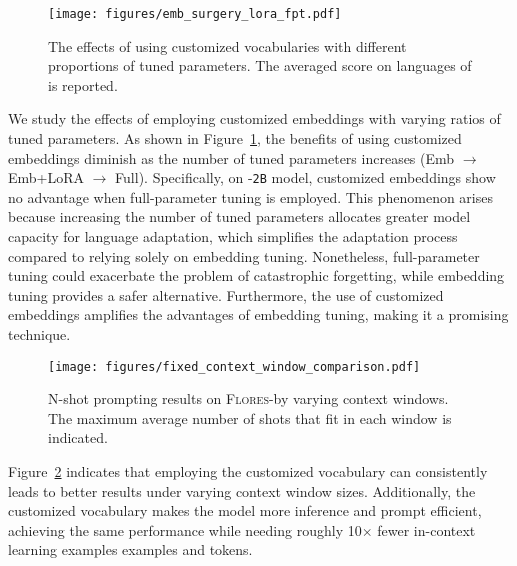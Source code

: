 \begin{figure}[t]
    \setlength{\abovecaptionskip}{-0.0001cm}
    \setlength{\belowcaptionskip}{-0.25cm}
    \centering
    \texttt{[image: figures/emb\_surgery\_lora\_fpt.pdf]}
    \vspace{-8mm}
    \caption{The effects of using customized vocabularies with different proportions of tuned parameters. The averaged score on \sea languages of \flores is reported.}
    \vspace{-6mm}
    \label{fig:emb_surgery_lora_fpt}
\end{figure}
We study the effects of employing customized embeddings with varying ratios of tuned parameters. As shown in Figure~\ref{fig:emb_surgery_lora_fpt}, the benefits of using customized embeddings diminish as the number of tuned parameters increases (Emb $\rightarrow$ Emb+LoRA $\rightarrow$ Full). Specifically, on \gemmatwo-\texttt{2B} model, customized embeddings show no advantage when full-parameter tuning is employed. This phenomenon arises because increasing the number of tuned parameters allocates greater model capacity for language adaptation, which simplifies the adaptation process compared to relying solely on embedding tuning. Nonetheless, full-parameter tuning could exacerbate the problem of catastrophic forgetting, while embedding tuning provides a safer alternative. Furthermore, the use of customized embeddings amplifies the advantages of embedding tuning, making it a promising technique.

\begin{figure}[t]
    \setlength{\abovecaptionskip}{-0.0001cm}
    \setlength{\belowcaptionskip}{-0.35cm}
    \centering
    \texttt{[image: figures/fixed\_context\_window\_comparison.pdf]}
    \vspace{-5mm}
    \caption{N-shot prompting results on \textsc{Flores}-\sea by varying context windows. The maximum average number of shots that fit in each window is indicated.}
    \vspace{-4mm}
    \label{fig:fixed_context_window_comparison}
\end{figure}
Figure~\ref{fig:fixed_context_window_comparison} indicates that employing the customized vocabulary can consistently leads to better results under varying context window sizes. Additionally, the customized vocabulary makes the model more inference and prompt efficient, achieving the same performance while needing roughly 10$\times$ fewer in-context learning examples examples and tokens.

